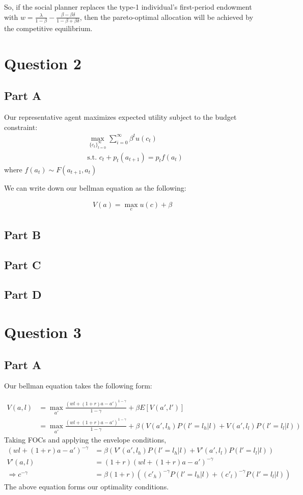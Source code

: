 \documentclass[11pt]{article} %
\begin{document}
So, if the social planner replaces the type-1 individual's first-period endowment with $w = \frac{\lambda}{1-\beta} -  \frac{\beta - \beta\delta}{1-\beta + \beta\delta}$, then the pareto-optimal allocation will be achieved by the competitive equilibrium.

\section{Question 2}
\subsection{Part A}
Our representative agent maximizes expected utility subject to the budget constraint:
\begin{align*}
&\max_{\{c_t\}_{t=0}^{\infty}} \sum_{i=0}^{\infty} \beta^t u(c_t)\\
&\text{s.t. }c_t + p_t(a_{t+1}) = p_tf(a_t) 
\end{align*}
where $f(a_t) \sim F(a_{t+1},a_{t})$

We can write down our bellman equation as the following:

\begin{align*}
V(a) = \max_{c} u(c) + \beta  
\end{align*}
\subsection{Part B}
\subsection{Part C}
\subsection{Part D}
\section{Question 3}
\subsection{Part A}
Our bellman equation takes the following form:

\begin{align*}
V(a,l) &= \max_{a'} \frac{(wl +(1+r)a - a')^{1-\gamma}}{1-\gamma} + \beta E[V(a',l')]\\
&=  \max_{a'} \frac{(wl +(1+r)a - a')^{1-\gamma}}{1-\gamma} + \beta (V(a',l_h)P(l'=l_h|l) + V(a',l_l)P(l'=l_l|l))
\end{align*}
Taking FOCs and applying the envelope conditions,
\begin{align*}
(wl +(1+r)a - a')^{-\gamma} &= \beta(V'(a',l_h)P(l'=l_h|l) + V'(a',l_l)P(l'=l_l|l))\\
V'(a,l) &= (1+r)(wl +(1+r)a - a')^{-\gamma}\\
\Rightarrow c^{-\gamma} &= \beta(1+r)((c'_h)^{-\gamma}P(l'=l_h|l) + (c'_l)^{-\gamma}P(l'=l_l|l) )
\end{align*}
The above equation forms our optimality conditions.
\end{document}
